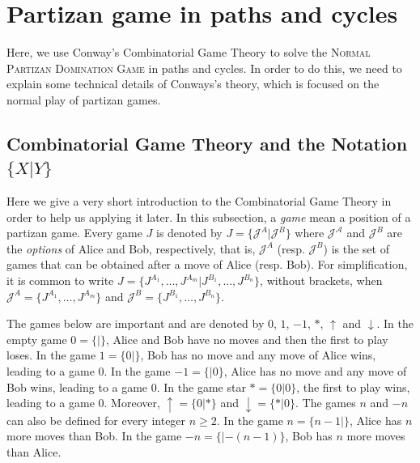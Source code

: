 \documentclass[12pt]{article}
\begin{document}
\section{Partizan game in paths and cycles}



Here, we use Conway's Combinatorial Game Theory to solve the \textsc{Normal Partizan Domination Game} in paths and cycles. In order to do this, we need to explain some technical details of Conways's theory, which is focused on the normal play
of partizan games.


\subsection{Combinatorial Game Theory and the Notation \texorpdfstring{$\{X|Y\}$}{X|Y}}

Here we give a very short introduction to the Combinatorial Game Theory in order to help us applying it later.
In this subsection, a \emph{game} mean a position of a partizan game.
Every game $J$ is denoted by $J=\{\mathcal{J}^A|\mathcal{J}^B\}$ where $\mathcal{J^A}$ and $\mathcal{J}^B$ are the \emph{options} of Alice and Bob, respectively, that is, $\mathcal{J}^A$ (resp. $\mathcal{J}^B$) is the set of games that can be obtained after a move of Alice (resp. Bob).
For simplification, it is common to write $J=\{J^{A_1},\ldots,J^{A_m}|J^{B_1},\ldots,J^{B_n}\}$, without brackets, when $\mathcal{J}^A=\{J^{A_1},\ldots,J^{A_m}\}$ and $\mathcal{J}^B=\{J^{B_1},\ldots,J^{B_n}\}$.

The games below are important and are denoted by $0$, $1$, $-1$, $*$, $\uparrow$ and $\downarrow$.
In the empty game $0=\{|\}$, Alice and Bob have no moves and then the first to play loses.
In the game $1=\{0|\}$, Bob has no move and any move of Alice wins, leading to a game 0.
In the game $-1=\{|0\}$, Alice has no move and any move of Bob wins, leading to a game 0.
In the game star $*=\{0|0\}$, the first to play wins, leading to a game 0.
Moreover, $\uparrow=\{0|*\}$ and $\downarrow=\{*|0\}$.
The games $n$ and $-n$ can also be defined for every integer $n\geq 2$. In the game $n=\{n-1|\}$, Alice has $n$ more moves than Bob. In the game $-n=\{|-(n-1)\}$, Bob has $n$ more moves than Alice.
\end{document}
